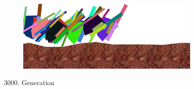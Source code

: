 \begin{figure}[H]
\begin{subfigure}[b]{0.45\textwidth}
              \includegraphics[width=\linewidth,center]{graphics/simulation-results/4_gen3000_4}
              \caption{\label{fig:gen3000_4}}
            \end{subfigure}
            \caption{3000. Generation \label{fig:gen3000}}
          \end{figure}

